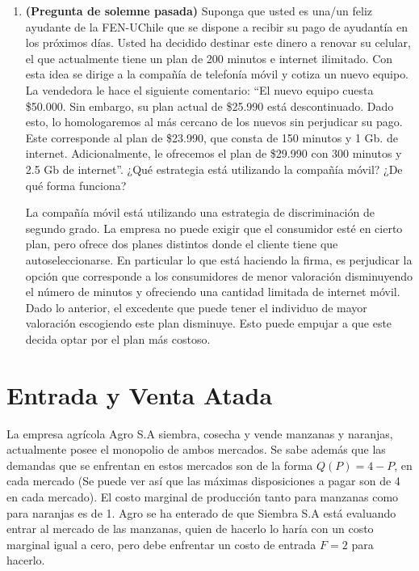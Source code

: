 \documentclass{exam}
\begin{document}
\begin{enumerate}
\begin{solution}
    \end{solution}
    \item \textbf{(Pregunta de solemne pasada)} Suponga que usted es una/un feliz ayudante de la FEN-UChile que se dispone a recibir su pago de ayudantía en los próximos días. Usted ha decidido destinar este dinero a renovar su celular, el que actualmente tiene un plan de 200 minutos e internet ilimitado. Con esta idea se dirige a la compañía de telefonía móvil y cotiza un nuevo equipo. La vendedora le hace el siguiente comentario: “El nuevo equipo cuesta \$50.000. Sin embargo, su plan actual de \$25.990 está descontinuado. Dado esto, lo homologaremos al más cercano de los nuevos sin perjudicar su pago. Este corresponde al plan de \$23.990, que consta de 150 minutos y 1 Gb. de internet. Adicionalmente, le ofrecemos el plan de \$29.990 con 300 minutos y 2.5 Gb de internet”. ¿Qué estrategia está utilizando la compañía móvil? ¿De qué forma funciona?
    \begin{solution}
        La compañía móvil está utilizando una estrategia de discriminación de segundo grado. La empresa no puede exigir que el consumidor esté en cierto plan, pero ofrece dos planes distintos donde el cliente tiene que autoseleccionarse. En particular lo que está haciendo la firma, es perjudicar la opción que corresponde a los consumidores de menor valoración disminuyendo el número de minutos y ofreciendo una cantidad limitada de internet móvil. Dado lo anterior, el excedente que puede tener el individuo de mayor valoración escogiendo este plan disminuye. Esto puede empujar a que este decida optar por el plan más costoso.
    \end{solution}
\end{enumerate}

    

\newpage
\section{Entrada y Venta Atada}

La empresa agrícola Agro S.A siembra, cosecha y vende manzanas y naranjas, actualmente posee el monopolio de ambos mercados. Se sabe además que las demandas que se enfrentan en estos mercados son de la forma $Q(P) = 4 - P$, en cada mercado (Se puede ver así que las máximas disposiciones a pagar son de 4 en cada mercado). El costo marginal de producción tanto para manzanas como para naranjas es de 1. Agro se ha enterado de que Siembra S.A está evaluando entrar al mercado de las manzanas, quien de hacerlo lo haría con un costo marginal igual a cero, pero debe enfrentar un costo de entrada $F = 2$ para hacerlo.
\end{document}
